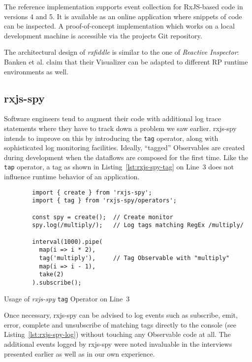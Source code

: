 \documentclass[12pt,a4paper]{article}
\begin{document}
The reference implementation supports event collection for RxJS-based code in versions 4 and 5. It is available as an online application where snippets of code can be inspected. A proof-of-concept implementation which works on a local development machine is accessible via the projects Git repository.

The architectural design of \emph{rxfiddle} is similar to the one of \emph{Reactive Inspector}: Banken et al. claim that their Visualizer can be adapted to different RP runtime environments as well.

\subsection{rxjs-spy}

Software engineers tend to augment their code with additional log trace statements where they have to track down a problem we saw earlier. rxjs-spy\cite{rxjsspy} intends to improve on this by introducing the \texttt{tag} operator, along with sophisticated log monitoring facilities. Ideally, ``tagged'' Observables are created during development when the dataflows are composed for the first time. Like the \texttt{tap} operator, a tag as shown in Listing~\ref{lst:rxjs-spy-tag} on Line~3 does not influence runtime behavior of an application.

\begin{listing}[H]
	\begin{verbatim}
		import { create } from 'rxjs-spy';
		import { tag } from 'rxjs-spy/operators';

		const spy = create();  // Create monitor
		spy.log(/multiply/);   // Log tags matching RegEx /multiply/

		interval(1000).pipe(
		  map(i => i * 2),
		  tag('multiply'),     // Tag Observable with "multiply"
		  map(i => i - 1),
		  take(2)
		).subscribe();
	\end{verbatim}
	\caption{Usage of \emph{rxjs-spy} \texttt{tag} Operator on Line~3}
	\label{lst:rxjs-spy-tag}
\end{listing}

Once necessary, rxjs-spy can be advised to log events such as subscribe, emit, error, complete and unsubscribe of matching tags directly to the console (see Listing~\ref{lst:rxjs-spy-log}) without touching any Observable code at all. The additional events logged by rxjs-spy were noted invaluable in the interviews presented earlier as well as in our own experience.
\end{document}
